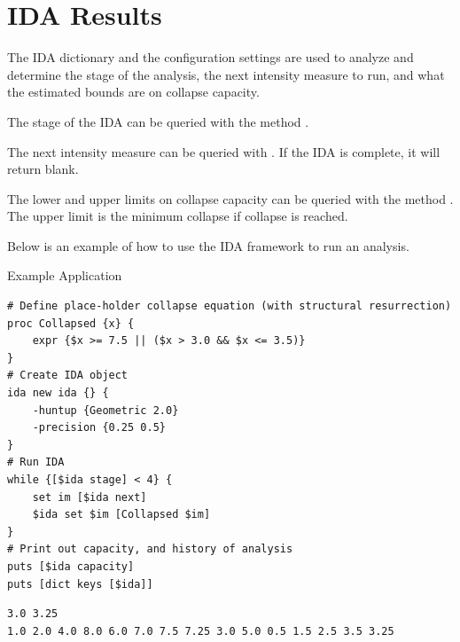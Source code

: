 \documentclass{article}
\renewcommand{\^}[1]{\textsuperscript{#1}}
\renewcommand{\_}[1]{\textsubscript{#1}}
\begin{document}
\section{IDA Results}
The IDA dictionary and the configuration settings are used to analyze and determine the stage of the analysis, the next intensity measure to run, and what the estimated bounds are on collapse capacity.

The stage of the IDA can be queried with the method .
\begin{syntax}
\end{syntax}

The next intensity measure can be queried with . 
If the IDA is complete, it will return blank.
\begin{syntax}
\end{syntax}

The lower and upper limits on collapse capacity can be queried with the method .
The upper limit is the minimum collapse if collapse is reached.
\begin{syntax}
\end{syntax}

Below is an example of how to use the IDA framework to run an analysis.
\begin{example}{Example Application}
\begin{lstlisting}
# Define place-holder collapse equation (with structural resurrection)
proc Collapsed {x} {
    expr {$x >= 7.5 || ($x > 3.0 && $x <= 3.5)}
}
# Create IDA object
ida new ida {} {
    -huntup {Geometric 2.0}
    -precision {0.25 0.5}
}
# Run IDA
while {[$ida stage] < 4} {
    set im [$ida next]
    $ida set $im [Collapsed $im]
}
# Print out capacity, and history of analysis
puts [$ida capacity]
puts [dict keys [$ida]]
\end{lstlisting}
\tcblower
\begin{lstlisting}
3.0 3.25
1.0 2.0 4.0 8.0 6.0 7.0 7.5 7.25 3.0 5.0 0.5 1.5 2.5 3.5 3.25
\end{lstlisting}
\end{example}



\end{document}
